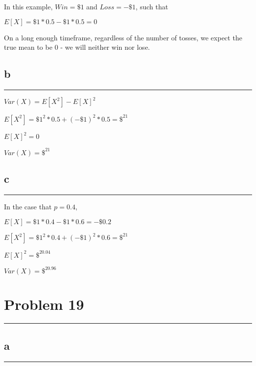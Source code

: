\documentclass[]{tufte-handout}
\begin{document}
In this example, \(Win = \$1\) and \(Loss = -\$1\), such that

\(E[X] = \$1* 0.5 -\$1*0.5 = 0\)

On a long enough timeframe, regardless of the number of tosses, we
expect the true mean to be 0 - we will neither win nor lose.

\hypertarget{b-10}{%
\subsection{b}\label{b-10}}

\begin{center}\rule{0.5\linewidth}{0.5pt}\end{center}

\(Var(X) = E[X^2] - E[X]^2\)

\(E[X^2] = \$1^2*0.5+(-\$1)^2*0.5 = \$^21\)

\(E[X]^2 = 0\)

\(Var(X) = \$^21\)

\hypertarget{c-4}{%
\subsection{c}\label{c-4}}

\begin{center}\rule{0.5\linewidth}{0.5pt}\end{center}

In the case that \(p = 0.4\),

\(E[X] = \$1* 0.4 -\$1*0.6 = -\$0.2\)

\(E[X^2] = \$1^2*0.4+(-\$1)^2*0.6 = \$^21\)

\(E[X]^2 = \$^20.04\)

\(Var(X) = \$^20.96\)

\hypertarget{problem-19}{%
\section{Problem 19}\label{problem-19}}

\begin{center}\rule{0.5\linewidth}{0.5pt}\end{center}

\hypertarget{a-11}{%
\subsection{a}\label{a-11}}

\begin{center}\rule{0.5\linewidth}{0.5pt}\end{center}
\end{document}
